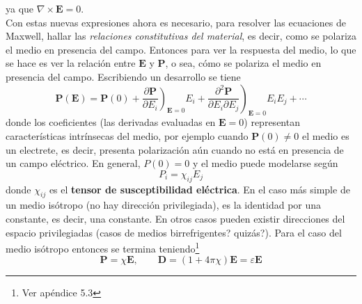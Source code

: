 ya que $\nabla \times \textbf{E} = 0$.\\
\indent Con estas nuevas expresiones ahora es necesario, para resolver las ecuaciones de Maxwell, hallar las \textit{relaciones constitutivas del material}, es decir, como se polariza el medio en presencia del campo. Entonces para ver la respuesta del medio, lo que se hace es ver la relación entre $\textbf{E}$ y $\textbf{P}$, o sea, cómo se polariza el medio en presencia del campo. Escribiendo un desarrollo se tiene
\begin{equation*}
    \textbf{P}(\textbf{E}) =
    \textbf{P}(0) + 
    \left.
        \frac{\partial\textbf{P}}{\partial E_{i}}
    \right)_{\textbf{E} = 0}E_{i} +
    \left.
        \frac{\partial^{2}\textbf{P}}{\partial E_{i}\partial E_{j}}
    \right)_{\textbf{E} = 0}E_{i}E_{j} +
    \cdots
\end{equation*}
donde los coeficientes (las derivadas evaluadas en $\textbf{E}= 0$) representan características intrínsecas del medio, por ejemplo cuando $\textbf{P}(0) \neq 0$ el medio es un electrete, es decir, presenta polarización aún cuando no está en presencia de un campo eléctrico. En general, $P(0) = 0$ y el medio puede modelarse según
\begin{equation*}
    P_{i} = \chi_{ij}E_{j}
\end{equation*}
donde $\chi_{ij}$ es el \textbf{tensor de susceptibilidad eléctrica}. En el caso más simple de un medio isótropo (no hay dirección privilegiada), es la identidad por una constante, es decir, una constante. En otros casos pueden existir direcciones del espacio privilegiadas (casos de medios birrefrigentes? quizás?). Para el caso del medio isótropo entonces se termina teniendo\footnote{Ver apéndice 5.3}
\begin{equation*}
    \textbf{P} = \chi \textbf{E},
    \quad
    \quad
    \textbf{D} = (1 + 4\pi\chi)\textbf{E} = \varepsilon \textbf{E}
\end{equation*}




